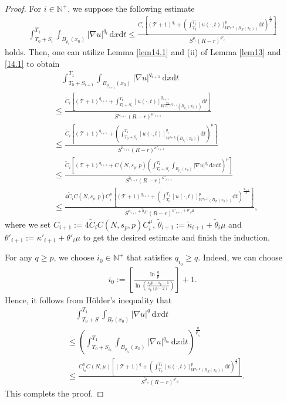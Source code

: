 \documentclass[reqno,10pt]{amsart}
\numberwithin{equation}{section}
\begin{document}
\begin{proof}
	For $i\in\mathbb{N}^+$, we suppose the following estimate 
	\begin{align*}
		\int_{T_0+S_i}^{T_1}\int_{B_{\rho_i}(x_0)}|\nabla u|^{q_i}\,\mathrm{d}x\mathrm{d}t\le \frac{C_i\left[\left(\mathcal{T}+1\right)^{q_i}+\left( \int_{T_0}^{T_1}[u(\cdot,t)]^{p}_{W^{s_p,p}\left( B_R(x_0)\right)}\mathrm{d}t\right)^\frac{q_i}{p}\right]}{S^{\tilde{\theta}_i}(R-r)^{\theta'_i}}
	\end{align*}
holds. Then, one can utilize Lemma \ref{lem14.1} and (ii) of Lemma \ref{lem13} and \eqref{14.1} to obtain
	\begin{align*}
		&\quad\int_{T_0+S_{i+1}}^{T_1}\int_{B_{\rho_{i+1}}(x_0)}|\nabla u|^{q_{i+1}}\,\mathrm{d}x\mathrm{d}t\\
		&\le \frac{\widetilde{C}_i\left[\left(\mathcal{T}+1\right)^{q_{i+1}}+ \int_{T_0+S_i}^{T_1}[u(\cdot,t)]^{q_{i+1}}_{W^{\frac{s_pq_i}{q_{i+1}},q_{i+1}}\left( B_{\rho_i}(x_0)\right)}\mathrm{d}t\right] }{S^{\tilde{\kappa}_{i+1}}(R-r)^{\kappa'_{i+1}}}\\
		&\le \frac{\widetilde{C}_i\left[\left(\mathcal{T}+1\right)^{q_{i+1}}+ \left( \int_{T_0+S_i}^{T_1}[u(\cdot,t)]^{q_{i}}_{W^{s_p,q_i}\left( B_{\rho_i}(x_0)\right)}\mathrm{d}t\right)^\mu \right] }{S^{\tilde{\kappa}_{i+1}}(R-r)^{\kappa'_{i+1}}}\\
		&\le \frac{\widetilde{C}_i\left[\left(\mathcal{T}+1\right)^{q_{i+1}}+ C(N,s_p,p)\left( \int_{T_0+S_i}^{T_1}\int_{B_{\rho_i}(x_0)}|\nabla u|^{q_i}\,\mathrm{d}x\mathrm{d}t\right)^\mu \right] }{S^{\tilde{\kappa}_{i+1}}(R-r)^{\kappa'_{i+1}}}\\
		&\le \frac{4\widetilde{C}_iC(N,s_p,p)C_i^\mu\left[\left(\mathcal{T}+1\right)^{q_{i+1}}+ \left( \int_{T_0}^{T_1}[u(\cdot,t)]^{p}_{W^{s_p,p}\left( B_{R}(x_0)\right)}\mathrm{d}t\right)^\frac{q_{i+1}}{p} \right] }{S^{\tilde{\kappa}_{i+1}+\tilde{\theta}_i\mu}(R-r)^{\kappa'_{i+1}+\theta'_{i}\mu}},
	\end{align*}
	where we set $C_{i+1}:=4\widetilde{C}_iC(N,s_p,p)C_i^\mu$, $\tilde{\theta}_{i+1}:=\tilde{\kappa}_{i+1}+\tilde{\theta}_i\mu$ and $\theta'_{i+1}:=\kappa'_{i+1}+\theta'_{i}\mu$ to get the desired estimate and finish the induction.
	
	For any $q\ge p$, we choose $i_0\in\mathbb{N}^+$ that satisfies $q_{i_0}\ge q$. Indeed, we can choose
	\begin{align*}
		i_0:=\left[ \frac{\ln\frac{q}{p}}{\ln\left( \frac{s_pp-s_p-1}{s_p(p-2)}\right)}\right]+1. 
	\end{align*}
	Hence, it follows from H\"{o}lder's inequality that
	\begin{align*}
		&\quad\int_{T_0+S}^{T_1}\int_{B_r(x_0)}|\nabla u|^{q}\,\mathrm{d}x\mathrm{d}t\\
		&\le\left( \int_{T_0+S_{i_0}}^{T_1}\int_{B_{\rho_{i_0}}(x_0)}|\nabla u|^{q_{i_0}}\,\mathrm{d}x\mathrm{d}t\right)^\frac{q}{q_{i_0}}\\
		&\le\frac{C_{i_0}^\mu C(N,\mu)\left[\left(\mathcal{T}+1\right)^q+\left( \int_{T_0}^{T_1}[u(\cdot,t)]^p_{W^{s_p,p}\left( B_R(x_0)\right)}\mathrm{d}t\right)^{\frac{q}{p}} \right]}{S^{\tilde{\theta}_{i_0}}(R-r)^{\theta'_{i_0}}}. 
	\end{align*}
This complets the proof.
\end{proof}
\end{document}
